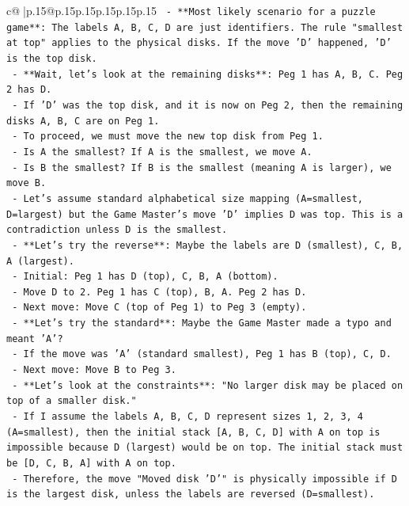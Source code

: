 \documentclass{article}
\begin{document}
{\begin{supertabular}{c@{$\;$}|p{.15\linewidth}@{}p{.15\linewidth}p{.15\linewidth}p{.15\linewidth}p{.15\linewidth}p{.15\linewidth}}
{{{\texttt{    {-} **Most likely scenario for a puzzle game**: The labels A, B, C, D are just identifiers. The rule "smallest at top" applies to the physical disks. If the move 'D' happened, 'D' is the top disk.} \\
\texttt{    {-} **Wait, let's look at the remaining disks**: Peg 1 has A, B, C. Peg 2 has D.} \\
\texttt{    {-} If 'D' was the top disk, and it is now on Peg 2, then the remaining disks A, B, C are on Peg 1.} \\
\texttt{    {-} To proceed, we must move the new top disk from Peg 1.} \\
\texttt{    {-} Is A the smallest? If A is the smallest, we move A.} \\
\texttt{    {-} Is B the smallest? If B is the smallest (meaning A is larger), we move B.} \\
\texttt{    {-} Let's assume standard alphabetical size mapping (A=smallest, D=largest) but the Game Master's move 'D' implies D was top. This is a contradiction unless D is the smallest.} \\
\texttt{    {-} **Let's try the reverse**: Maybe the labels are D (smallest), C, B, A (largest).} \\
\texttt{        {-} Initial: Peg 1 has D (top), C, B, A (bottom).} \\
\texttt{        {-} Move D to 2. Peg 1 has C (top), B, A. Peg 2 has D.} \\
\texttt{        {-} Next move: Move C (top of Peg 1) to Peg 3 (empty).} \\
\texttt{    {-} **Let's try the standard**: Maybe the Game Master made a typo and meant 'A'?} \\
\texttt{        {-} If the move was 'A' (standard smallest), Peg 1 has B (top), C, D.} \\
\texttt{        {-} Next move: Move B to Peg 3.} \\
\texttt{    {-} **Let's look at the constraints**: "No larger disk may be placed on top of a smaller disk."} \\
\texttt{    {-} If I assume the labels A, B, C, D represent sizes 1, 2, 3, 4 (A=smallest), then the initial stack {[}A, B, C, D{]} with A on top is impossible because D (largest) would be on top. The initial stack must be {[}D, C, B, A{]} with A on top.} \\
\texttt{    {-} Therefore, the move "Moved disk 'D'" is physically impossible if D is the largest disk, unless the labels are reversed (D=smallest).} \\
}}}
\end{supertabular}}
\end{document}
